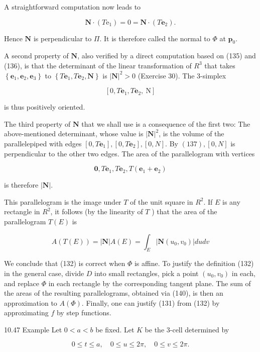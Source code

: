 \documentclass[10pt]{article}
\begin{document}
A straightforward computation now leads to

$$
\mathbf{N} \cdot\left(T \mathrm{e}_{1}\right)=0=\mathbf{N} \cdot\left(T \mathbf{e}_{2}\right) .
$$

Hence $\mathbf{N}$ is perpendicular to $\Pi$. It is therefore called the normal to $\Phi$ at $\mathbf{p}_{0}$.

A second property of $\mathbf{N}$, also verified by a direct computation based on (135) and (136), is that the determinant of the linear transformation of $R^{3}$ that takes $\left\{\mathbf{e}_{1}, \mathbf{e}_{2}, \mathbf{e}_{3}\right\}$ to $\left\{T \mathbf{e}_{1}, T \mathbf{e}_{2}, \mathbf{N}\right\}$ is $|\mathbf{N}|^{2}>0$ (Exercise 30). The 3-simplex

$$
\left[0, T \mathbf{e}_{1}, T \mathbf{e}_{2}, \mathrm{~N}\right]
$$

is thus positively oriented.

The third property of $\mathbf{N}$ that we shall use is a consequence of the first two: The above-mentioned determinant, whose value is $|\mathbf{N}|^{2}$, is the volume of the parallelepiped with edges $\left[0, T \mathbf{e}_{1}\right],\left[0, T \mathbf{e}_{2}\right],[0, N]$. By $(137),[0, N]$ is perpendicular to the other two edges. The area of the parallelogram with vertices

$$
\mathbf{0}, T \mathbf{e}_{1}, T \mathbf{e}_{2}, T\left(\mathbf{e}_{1}+\mathbf{e}_{2}\right)
$$

is therefore $|\mathbf{N}|$.

This parallelogram is the image under $T$ of the unit square in $R^{2}$. If $E$ is any rectangle in $R^{2}$, it follows (by the linearity of $T$ ) that the area of the parallelogram $T(E)$ is

$$
A(T(E))=|\mathbf{N}| A(E)=\int_{E}\left|\mathbf{N}\left(u_{0}, v_{0}\right)\right| d u d v
$$

We conclude that (132) is correct when $\Phi$ is affine. To justify the definition (132) in the general case, divide $D$ into small rectangles, pick a point $\left(u_{0}, v_{0}\right)$ in each, and replace $\Phi$ in each rectangle by the corresponding tangent plane. The sum of the areas of the resulting parallelograms, obtained via (140), is then an approximation to $A(\Phi)$. Finally, one can justify (131) from (132) by approximating $f$ by step functions.

10.47 Example Let $0<a<b$ be fixed. Let $K$ be the 3-cell determined by

$$
0 \leq t \leq a, \quad 0 \leq u \leq 2 \pi, \quad 0 \leq v \leq 2 \pi .
$$
\end{document}
